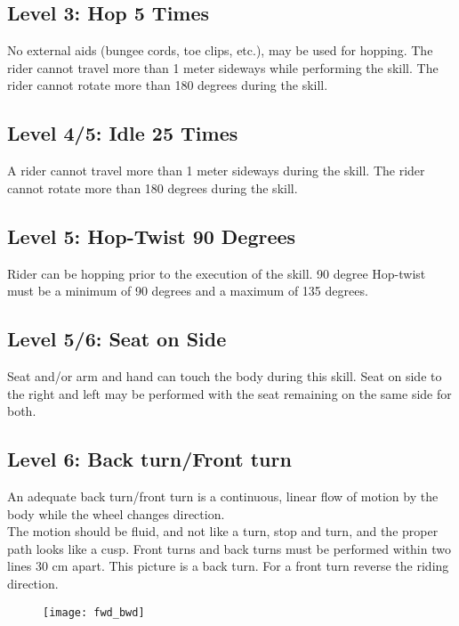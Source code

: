 \subsection{Level 3: Hop 5 Times}
No external aids (bungee cords, toe clips, etc.), may be used for hopping. The rider cannot travel more than 1 meter
sideways while performing the skill. The rider cannot rotate more than 180 degrees during the skill.

\subsection{Level 4/5: Idle 25 Times}
A rider cannot travel more than 1 meter sideways during the skill. The rider cannot rotate more than 180 degrees
during the skill.

\subsection{Level 5: Hop-Twist 90 Degrees}
Rider can be hopping prior to the execution of the skill. 90 degree Hop-twist must be a minimum of 90 degrees and a
maximum of 135 degrees.

\subsection{Level 5/6: Seat on Side}
Seat and/or arm and hand can touch the body during this skill. Seat on side to the right and left may be performed with
the seat remaining on the same side for both.

\subsection{Level 6: Back turn/Front turn}
An adequate back turn/front turn is a continuous, linear flow of motion by the body while the wheel changes direction. \\
The motion should be fluid, and not like a turn, stop and turn, and the proper path looks like a cusp. Front turns and
back turns must be performed within two lines 30 cm apart. This picture is a back turn. For a front turn reverse the
riding direction.

\begin{figure}[h]
\begin{center}
\texttt{[image: fwd\_bwd]}
\end{center}
\vspace{-20pt}
\vspace{-10pt}
\end{figure}

